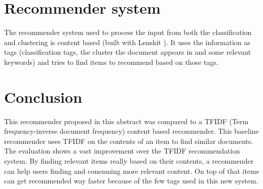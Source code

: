 \documentclass[twocolumn]{phdsymp} %
\begin{document}
\section{Recommender system}
The recommender system used to process the input from both the classification and clustering is content based (built with Lenskit \cite{Ekstrand2011}). It uses the information as tags (classification tags, the cluster the document appears in and some relevant keywords) and tries to find items to recommend based on those tags. 

\section{Conclusion}
This recommender proposed in this abstract was compared to a TFIDF (Term frequency-inverse document frequency) content based recommender. This baseline recommender uses TFIDF on the contents of an item to find similar documents. The evaluation shows a vast improvement over the TFIDF recommendation system. By finding relevant items really based on their contents, a recommender can help users finding and consuming more relevant content. On top of that items can get recommended way faster because of the few tags used in this new system. 


{}  %
\end{document}
